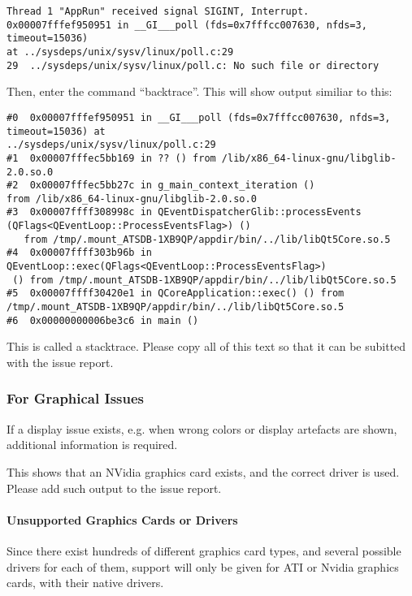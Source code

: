 \begin{verbatim}
Thread 1 "AppRun" received signal SIGINT, Interrupt.
0x00007fffef950951 in __GI___poll (fds=0x7fffcc007630, nfds=3, timeout=15036) 
at ../sysdeps/unix/sysv/linux/poll.c:29
29	../sysdeps/unix/sysv/linux/poll.c: No such file or directory
\end{verbatim}

Then, enter the command ``backtrace''. This will show output similiar to this:

\begin{verbatim}
#0  0x00007fffef950951 in __GI___poll (fds=0x7fffcc007630, nfds=3, timeout=15036) at 
../sysdeps/unix/sysv/linux/poll.c:29
#1  0x00007fffec5bb169 in ?? () from /lib/x86_64-linux-gnu/libglib-2.0.so.0
#2  0x00007fffec5bb27c in g_main_context_iteration () 
from /lib/x86_64-linux-gnu/libglib-2.0.so.0
#3  0x00007ffff308998c in QEventDispatcherGlib::processEvents
(QFlags<QEventLoop::ProcessEventsFlag>) ()
   from /tmp/.mount_ATSDB-1XB9QP/appdir/bin/../lib/libQt5Core.so.5
#4  0x00007ffff303b96b in QEventLoop::exec(QFlags<QEventLoop::ProcessEventsFlag>)
 () from /tmp/.mount_ATSDB-1XB9QP/appdir/bin/../lib/libQt5Core.so.5
#5  0x00007ffff30420e1 in QCoreApplication::exec() () from 
/tmp/.mount_ATSDB-1XB9QP/appdir/bin/../lib/libQt5Core.so.5
#6  0x00000000006be3c6 in main ()
\end{verbatim}

This is called a stacktrace. Please copy all of this text so that it can be subitted with the issue report.

\subsubsection{For Graphical Issues}

If a display issue exists, e.g. when wrong colors or display artefacts are shown, additional information is required.



This shows that an NVidia graphics card exists, and the correct driver is used. Please add such output to the issue report.

\paragraph{Unsupported Graphics Cards or Drivers}

Since there exist hundreds of different graphics card types, and several possible drivers for each of them, support will only be given for ATI or Nvidia graphics cards, with their native drivers.

